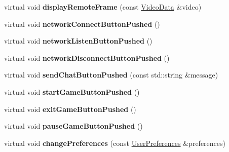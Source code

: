 \begin{DoxyCompactItemize}
\item 
\hypertarget{classMFCUserInterface_afea24df787ef3ebdd57ad7c6435e14cc}{
virtual void {\bfseries displayRemoteFrame} (const \hyperlink{structVideoData}{VideoData} \&video)}
\label{classMFCUserInterface_afea24df787ef3ebdd57ad7c6435e14cc}

\item 
\hypertarget{classMFCUserInterface_a25bf67955e01502250d4239ea6dc9e6d}{
virtual void {\bfseries networkConnectButtonPushed} ()}
\label{classMFCUserInterface_a25bf67955e01502250d4239ea6dc9e6d}

\item 
\hypertarget{classMFCUserInterface_ad19ff1d9fe21137d564c7f91d6d9638a}{
virtual void {\bfseries networkListenButtonPushed} ()}
\label{classMFCUserInterface_ad19ff1d9fe21137d564c7f91d6d9638a}

\item 
\hypertarget{classMFCUserInterface_a05124c9a819899bf74dbbbd1ba27d32d}{
virtual void {\bfseries networkDisconnectButtonPushed} ()}
\label{classMFCUserInterface_a05124c9a819899bf74dbbbd1ba27d32d}

\item 
\hypertarget{classMFCUserInterface_a645879dc2e81a2d2810d215bbc435d87}{
virtual void {\bfseries sendChatButtonPushed} (const std::string \&message)}
\label{classMFCUserInterface_a645879dc2e81a2d2810d215bbc435d87}

\item 
\hypertarget{classMFCUserInterface_a3ded83efa5ecbc38a21051dd90dc661e}{
virtual void {\bfseries startGameButtonPushed} ()}
\label{classMFCUserInterface_a3ded83efa5ecbc38a21051dd90dc661e}

\item 
\hypertarget{classMFCUserInterface_a0bfd2943d3cf9e704bb71880eb3aa865}{
virtual void {\bfseries exitGameButtonPushed} ()}
\label{classMFCUserInterface_a0bfd2943d3cf9e704bb71880eb3aa865}

\item 
\hypertarget{classMFCUserInterface_a99a9356281a3d713e0fda41940f7a6fb}{
virtual void {\bfseries pauseGameButtonPushed} ()}
\label{classMFCUserInterface_a99a9356281a3d713e0fda41940f7a6fb}

\item 
\hypertarget{classMFCUserInterface_ab979a02b0fb024ebdd2e8cc958e26d42}{
virtual void {\bfseries changePreferences} (const \hyperlink{structUserPreferences}{UserPreferences} \&preferences)}
\label{classMFCUserInterface_ab979a02b0fb024ebdd2e8cc958e26d42}


\end{DoxyCompactItemize}
